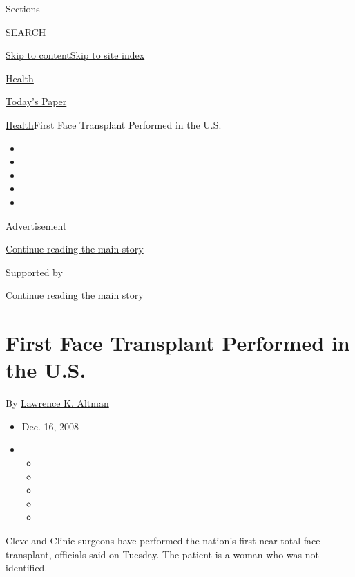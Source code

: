 Sections

SEARCH

\protect\hyperlink{site-content}{Skip to
content}\protect\hyperlink{site-index}{Skip to site index}

\href{https://www.nytimes.com/section/health}{Health}

\href{https://myaccount.nytimes.com/auth/login?response_type=cookie\&client_id=vi}{}

\href{https://www.nytimes.com/section/todayspaper}{Today's Paper}

\href{/section/health}{Health}\textbar{}First Face Transplant Performed
in the U.S.

\begin{itemize}
\item
\item
\item
\item
\item
\end{itemize}

Advertisement

\protect\hyperlink{after-top}{Continue reading the main story}

Supported by

\protect\hyperlink{after-sponsor}{Continue reading the main story}

\hypertarget{first-face-transplant-performed-in-the-us}{%
\section{First Face Transplant Performed in the
U.S.}\label{first-face-transplant-performed-in-the-us}}

By \href{https://www.nytimes.com/by/lawrence-k-altman}{Lawrence K.
Altman}

\begin{itemize}
\item
  Dec. 16, 2008
\item
  \begin{itemize}
  \item
  \item
  \item
  \item
  \item
  \end{itemize}
\end{itemize}

Cleveland Clinic surgeons have performed the nation's first near total
face transplant, officials said on Tuesday. The patient is a woman who
was not identified.

